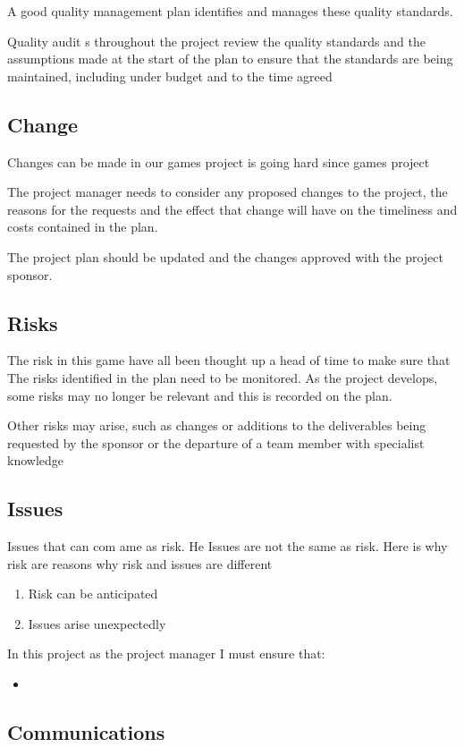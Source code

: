\documentclass{article}
\begin{document}
A good quality management plan identifies and manages these quality standards.

Quality audit s throughout the project review the quality standards and the assumptions made at the start of the plan to ensure that the standards are being maintained, including under budget and to the time agreed


\subsection{Change}
Changes can be made in our games project is going hard since games project  

The project manager needs to consider any proposed changes to the project, the reasons for the requests and the effect that change will have on the timeliness and costs contained in the plan.

The project plan should be updated and the changes approved with the project sponsor.

\subsection{Risks}
The risk in this game have all been thought up a head of time to make sure that 
The risks identified in the plan need to be monitored. As the project develops, some risks may no longer be relevant and this is recorded on the plan. 

Other risks may arise, such as changes or additions to the deliverables being requested by the sponsor or the departure of a team member with specialist knowledge

\subsection{Issues}
Issues that can com ame as risk. He
Issues are not the same as risk. Here is why risk are reasons why risk and issues are different
\begin{enumerate}
	\item Risk can be anticipated
	\item Issues arise unexpectedly
\end{enumerate}

In this project as the project manager I must ensure that:
\begin{itemize}
	\item
\end{itemize}

\subsection{Communications}
\end{document}
